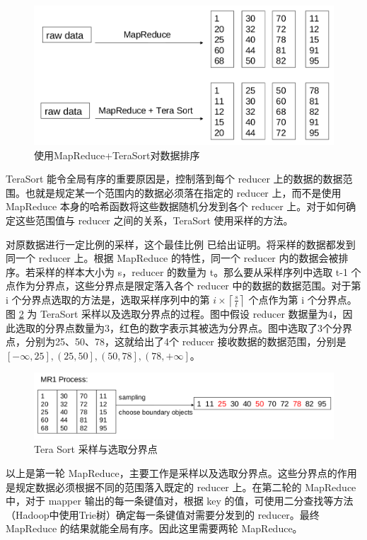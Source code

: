 \begin{figure}[ht] 
\centering\includegraphics[width=4.5in]{picture/ch_terasort_mr/tera_sort} 
\caption{使用MapReduce+TeraSort对数据排序}\label{tera_sort} 
\end{figure}

TeraSort 能令全局有序的重要原因是，控制落到每个 reducer 上的数据的数据范围。也就是规定某一个范围内的数据必须落在指定的 reducer 上，而不是使用 MapReduce 本身的哈希函数将这些数据随机分发到各个 reducer 上。对于如何确定这些范围值与 reducer 之间的关系，TeraSort 使用采样的方法。

对原数据进行一定比例的采样，这个最佳比例 \cite{tao2013minimal} 已给出证明。将采样的数据都发到同一个 reducer 上。根据 MapReduce 的特性，同一个 reducer 内的数据会被排序。若采样的样本大小为 s，reducer 的数量为 t。那么要从采样序列中选取 t-1 个点作为分界点，这些分界点是限定落入各个 reducer 中的数据的数据范围。对于第 i 个分界点选取的方法是，选取采样序列中的第 $i\times \left \lceil \frac{s}{t} \right \rceil$ 个点作为第 i 个分界点。图 \ref{tera_sort_mr1} 为  TeraSort 采样以及选取分界点的过程。图中假设 reducer 数据量为4，因此选取的分界点数量为3，红色的数字表示其被选为分界点。图中选取了3个分界点，分别为25、50、78，这就给出了4个 reducer 接收数据的数据范围，分别是$\left[- \infty, 25 \right], \left(25, 50 \right], \left(50, 78 \right], \left(78, +\infty \right]$。

\begin{figure}[!htb] 
\centering\includegraphics[width=6in]{picture/ch_terasort_mr/tera_sort_mr1} 
\caption{Tera Sort 采样与选取分界点}\label{tera_sort_mr1} 
\end{figure}

以上是第一轮 MapReduce，主要工作是采样以及选取分界点。这些分界点的作用是规定数据必须根据不同的范围落入既定的 reducer 上。在第二轮的 MapReduce 中，对于 mapper 输出的每一条键值对，根据 key 的值，可使用二分查找等方法（Hadoop中使用Trie树）确定每一条键值对需要分发到的 reducer。最终 MapReduce 的结果就能全局有序。因此这里需要两轮 MapReduce。

